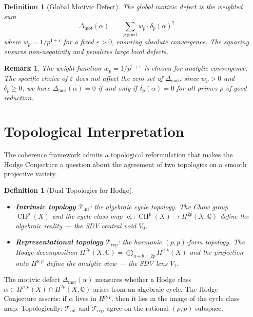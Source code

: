 \documentclass[11pt]{article}
\newtheorem{definition}[theorem]{Definition}
\newtheorem{remark}[theorem]{Remark}
\theoremstyle{definition}
\begin{document}
\begin{definition}[Global Motivic Defect]
\label{def:global-defect}
The \emph{global motivic defect} is the weighted sum
\[
  \Delta_{\mathrm{mot}}(\alpha)
  \;=\;
  \sum_{p \;\text{good}} w_p \cdot \delta_p(\alpha)^2
\]
where $w_p = 1/p^{1+\varepsilon}$ for a fixed $\varepsilon > 0$, ensuring
absolute convergence.  The squaring ensures non-negativity and penalizes
large local defects.
\end{definition}

\begin{remark}
The weight function $w_p = 1/p^{1+\varepsilon}$ is chosen for analytic
convergence.  The specific choice of $\varepsilon$ does not affect the
zero-set of $\Delta_{\mathrm{mot}}$: since $w_p > 0$ and $\delta_p \geq 0$,
we have $\Delta_{\mathrm{mot}}(\alpha) = 0$ if and only if $\delta_p(\alpha) = 0$
for all primes $p$ of good reduction.
\end{remark}

\section{Topological Interpretation}
\label{sec:topology}

The coherence framework admits a topological reformulation that makes
the Hodge Conjecture a question about the agreement of two topologies
on a smooth projective variety.

\begin{definition}[Dual Topologies for Hodge]
\label{def:hodge-topo}
\mbox{}
\begin{itemize}
\item \textbf{Intrinsic topology} $\mathcal{T}_{\mathrm{int}}$:
the algebraic cycle topology.  The Chow group $\operatorname{CH}^p(X)$
and the cycle class map $\operatorname{cl}: \operatorname{CH}^p(X)
\to H^{2p}(X, \mathbb{Q})$ define the algebraic reality --- the SDV
central void $V_0$.
\item \textbf{Representational topology} $\mathcal{T}_{\mathrm{rep}}$:
the harmonic $(p,p)$-form topology.  The Hodge decomposition
$H^{2p}(X, \mathbb{C}) = \bigoplus_{a+b=2p} H^{a,b}(X)$ and the
projection onto $H^{p,p}$ define the analytic view --- the SDV
lens $V_1$.
\end{itemize}
\end{definition}

\noindent
The motivic defect $\Delta_{\mathrm{mot}}(\alpha)$ measures whether
a Hodge class $\alpha \in H^{p,p}(X) \cap H^{2p}(X, \mathbb{Q})$
arises from an algebraic cycle.  The Hodge Conjecture asserts: if
$\alpha$ lives in $H^{p,p}$, then it lies in the image of the cycle
class map.  Topologically: $\mathcal{T}_{\mathrm{int}}$ and
$\mathcal{T}_{\mathrm{rep}}$ agree on the rational $(p,p)$-subspace.
\end{document}
